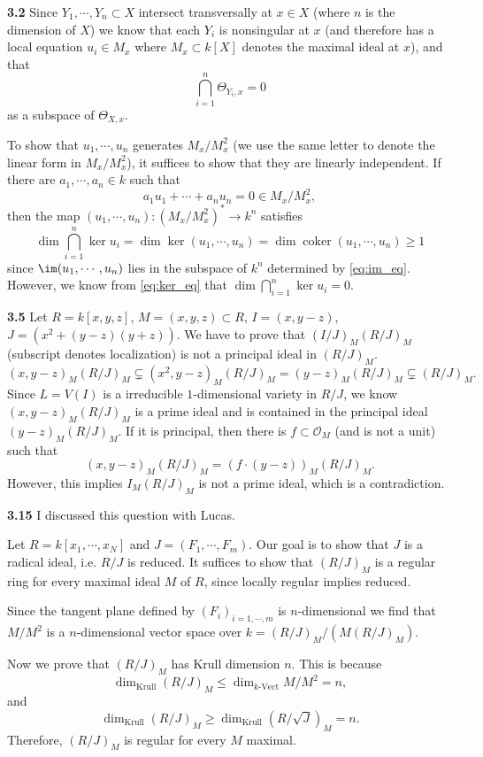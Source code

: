 \documentclass{article}
\makeatletter
\newcommand*{\shifttext}[1]{%
  \settowidth{\@tempdima}{#1}%
  \hspace{-\@tempdima}#1%
}
\newcommand{\plabel}[1]{%
\shifttext{\textbf{#1}\quad}%
}
\makeatother
\begin{document}
\plabel{3.2}%
Since $Y_1,\cdots,Y_n\subset X$ intersect transversally at $x\in X$ (where $n$ is the dimension of $X$) we know that each $Y_i$ is nonsingular at $x$ (and therefore has a local equation $u_i \in M_x$ where $M_x\subset k[X]$ denotes the maximal ideal at $x$), and that
\begin{equation}
    \label{eq:ker_eq}
    \bigcap_{i=1}^n \Theta_{Y_i,x} = \qty{0}
\end{equation}
as a subspace of $\Theta_{X,x}$.
\par
To show that $u_1,\cdots,u_n$ generates $M_x/M_x^2$ (we use the same letter to denote the linear form in $M_x/M_x^2$), it suffices to show that they are linearly independent.
If there are $a_1,\cdots,a_n\in k$ such that
\begin{equation}
    \label{eq:im_eq}
    a_1 u_1 + \cdots + a_n u_n = 0 \in M_x/M_x^2,
\end{equation}
then the map $(u_1,\cdots,u_n): (M_x/M_x^2)^* \rightarrow k^n$ satisfies
\[ \dim \bigcap_{i=1}^n \ker u_i = \dim \ker(u_1,\cdots,u_n) = \dim \operatorname{coker}(u_1,\cdots,u_n) \ge 1 \]
since $\im (u_1,\cdots,u_n)$ lies in the subspace of $k^n$ determined by \eqref{eq:im_eq}.
However, we know from \eqref{eq:ker_eq} that $\dim \bigcap_{i=1}^n \ker u_i = 0$.

\plabel{3.5}%
Let $R=k[x,y,z]$, $M = (x,y,z)\subset R$, $I = (x, y-z)$, $J = (x^2 + (y-z)(y+z))$.
We have to prove that $(I/J)_M (R/J)_M$ (subscript denotes localization) is not a principal ideal in $(R/J)_M$.
\[ (x, y-z)_M (R/J)_M \subsetneq (x^2,y-z)_M (R/J)_M = (y-z)_M (R/J)_M \subsetneq (R/J)_M. \]
Since $L = V(I)$ is a irreducible $1$-dimensional variety in $R/J$, we know $(x,y-z)_M(R/J)_M$ is a prime ideal and is contained in the principal ideal $(y-z)_M(R/J)_M$.
If it is principal, then there is $f\subset \mathcal{O}_M$ (and is not a unit) such that
\[ (x, y-z)_M (R/J)_M = (f\cdot (y-z))_M (R/J)_M. \]
However, this implies $I_M(R/J)_M$ is not a prime ideal, which is a contradiction.

\plabel{3.15}%
I discussed this question with Lucas.
\par
Let $R = k[x_1,\cdots,x_N]$ and $J = (F_1,\cdots,F_m)$.
Our goal is to show that $J$ is a radical ideal, i.e. $R/J$ is reduced.
It suffices to show that $(R/J)_M$ is a regular ring for every maximal ideal $M$ of $R$, since locally regular implies reduced.
\par
Since the tangent plane defined by $(F_i)_{i=1,\cdots,m}$ is $n$-dimensional we find that $M/M^2$ is a $n$-dimensional vector space over $k = (R/J)_M/(M(R/J)_M)$.
\par
Now we prove that $(R/J)_M$ has Krull dimension $n$.
This is because
\[ \dim_{\text{Krull}} (R/J)_M \le \dim_{k\text{-Vect}} M/M^2 = n, \]
and
\[ \dim_{\text{Krull}} (R/J)_M \ge \dim_{\text{Krull}} (R/\sqrt{J})_M = n. \]
Therefore, $(R/J)_M$ is regular for every $M$ maximal.
\end{document}
